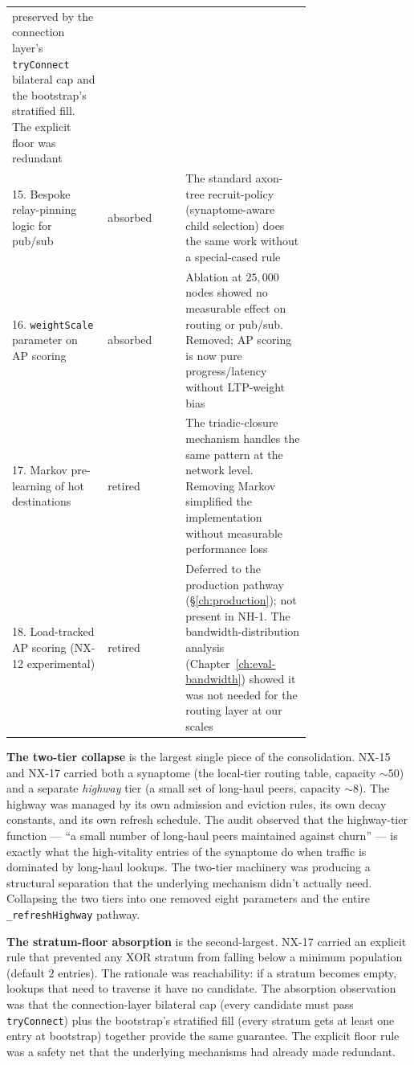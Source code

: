 \documentclass[twoside,nobib]{tufte-book}
\begin{document}
\begin{table}[h]
\begin{tabular}{@{}p{0.32\linewidth}lp{0.42\linewidth}@{}}
  preserved by the connection layer's \texttt{tryConnect} bilateral
  cap and the bootstrap's stratified fill. The explicit floor was
  redundant \\
15. Bespoke relay-pinning logic for pub/sub & absorbed & The standard
  axon-tree recruit-policy (synaptome-aware child selection) does
  the same work without a special-cased rule \\
16. \texttt{weightScale} parameter on AP scoring & absorbed &
  Ablation at $25{,}000$ nodes showed no measurable effect on
  routing or pub/sub. Removed; AP scoring is now pure
  progress/latency without LTP-weight bias \\
\midrule
17. Markov pre-learning of hot destinations & retired & The
  triadic-closure mechanism handles the same pattern at the
  network level. Removing Markov simplified the implementation
  without measurable performance loss \\
18. Load-tracked AP scoring (NX-12 experimental) & retired &
  Deferred to the production pathway (\S\ref{ch:production});
  not present in NH-1. The bandwidth-distribution analysis
  (Chapter~\ref{ch:eval-bandwidth}) showed it was not needed for
  the routing layer at our scales \\
\bottomrule
\end{tabular}
\end{table}

\textbf{The two-tier collapse} is the largest single piece of the
consolidation. NX-15 and NX-17 carried both a synaptome (the
local-tier routing table, capacity $\sim 50$) and a separate
\emph{highway} tier (a small set of long-haul peers, capacity
$\sim 8$). The highway was managed by its own admission and
eviction rules, its own decay constants, and its own refresh
schedule. The audit observed that the highway-tier function ---
``a small number of long-haul peers maintained against churn''
--- is exactly what the high-vitality entries of the synaptome
do when traffic is dominated by long-haul lookups. The two-tier
machinery was producing a structural separation that the
underlying mechanism didn't actually need. Collapsing the two
tiers into one removed eight parameters and the entire
\texttt{\_refreshHighway} pathway.

\textbf{The stratum-floor absorption} is the second-largest. NX-17
carried an explicit rule that prevented any XOR stratum from
falling below a minimum population (default $2$ entries). The
rationale was reachability: if a stratum becomes empty, lookups
that need to traverse it have no candidate. The absorption
observation was that the connection-layer bilateral cap (every
candidate must pass \texttt{tryConnect}) plus the bootstrap's
stratified fill (every stratum gets at least one entry at
bootstrap) together provide the same guarantee. The explicit
floor rule was a safety net that the underlying mechanisms had
already made redundant.
\end{document}
